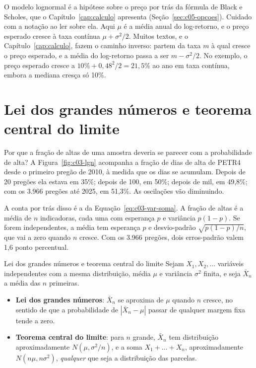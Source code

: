 O modelo lognormal é a hipótese sobre o preço por trás da fórmula de Black e Scholes, que o Capítulo~\ref{cap:calculo} apresenta (Seção~\ref{sec:c05-opcoes}). Cuidado com a notação ao ler sobre ela. Aqui $\mu$ é a média anual do log-retorno, e o preço esperado cresce à taxa contínua $\mu + \sigma^2/2$. Muitos textos, e o Capítulo~\ref{cap:calculo}, fazem o caminho inverso: partem da taxa $m$ à qual cresce o preço esperado, e a média do log-retorno passa a ser $m - \sigma^2/2$. No exemplo, o preço esperado cresce a $10\% + 0,48^2/2 = 21,5\%$ ao ano em taxa contínua, embora a mediana cresça só 10\%.

\section{Lei dos grandes números e teorema central do limite}
\label{sec:c03-tcl}

Por que a fração de altas de uma amostra deveria se parecer com a probabilidade de alta? A Figura~\ref{fig:c03-lgn} acompanha a fração de dias de alta de PETR4 desde o primeiro pregão de 2010, à medida que os dias se acumulam. Depois de 20 pregões ela estava em 35\%; depois de 100, em 50\%; depois de mil, em 49,8\%; com os 3.966 pregões até 2025, em 51,3\%. As oscilações vão diminuindo.


A conta por trás disso é a da Equação~\eqref{eq:c03-var-soma}. A fração de altas é a média de $n$ indicadoras, cada uma com esperança $p$ e variância $p(1-p)$. Se forem independentes, a média tem esperança $p$ e desvio-padrão $\sqrt{p(1-p)/n}$, que vai a zero quando $n$ cresce. Com os 3.966 pregões, dois erros-padrão valem 1,6 ponto percentual.

\begin{resultado}{Lei dos grandes números e teorema central do limite}
Sejam $X_1, X_2, \dots$ variáveis independentes com a mesma distribuição, média $\mu$ e variância $\sigma^2$ finita, e seja $\bar X_n$ a média das $n$ primeiras.
\begin{itemize}[leftmargin=1.2em]
  \item \textbf{Lei dos grandes números}: $\bar X_n$ se aproxima de $\mu$ quando $n$ cresce, no sentido de que a probabilidade de $|\bar X_n - \mu|$ passar de qualquer margem fixa tende a zero.
  \item \textbf{Teorema central do limite}: para $n$ grande, $\bar X_n$ tem distribuição aproximadamente $N(\mu, \sigma^2/n)$, e a soma $X_1 + \dots + X_n$, aproximadamente $N(n\mu, n\sigma^2)$, \emph{qualquer} que seja a distribuição das parcelas.
\end{itemize}
\end{resultado}

